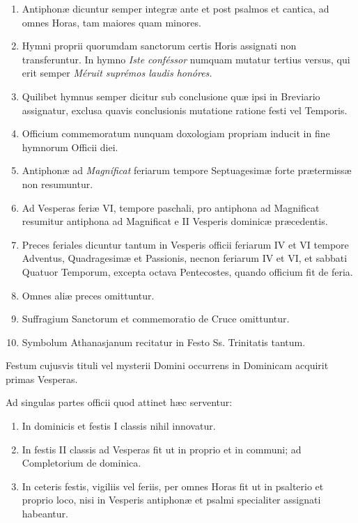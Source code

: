 \documentclass[vesperale_romanum.tex]{subfiles}
\begin{document}
\begin{enumerate}[nosep]
\item Antiphonæ dicuntur semper integræ ante et post psalmos et cantica, ad omnes Horas, tam maiores quam minores.
\item Hymni proprii quorumdam sanctorum certis Horis assignati non transferuntur. In hymno \textit{Iste conféssor} numquam mutatur tertius versus, qui erit semper \textit{Méruit suprémos laudis honóres.}
\item Quilibet hymnus semper dicitur sub conclusione quæ ipsi in Breviario assignatur, exclusa quavis conclusionis mutatione ratione festi vel Temporis.
\item Officium commemoratum nunquam doxologiam propriam inducit in fine hymnorum Officii diei.
\item Antiphonæ ad \textit{Magníficat} feriarum tempore Septuagesimæ forte prætermissæ non resumuntur.
\item Ad Vesperas feriæ VI, tempore paschali, pro antiphona ad Magnificat resumitur antiphona ad Magnificat e II Vesperis dominicæ præcedentis.
\item Preces feriales dicuntur tantum in Vesperis officii feriarum IV et VI tempore Adventus, Quadragesimæ et Passionis, necnon feriarum IV et VI, et sabbati Quatuor Temporum, excepta octava Pentecostes, quando officium fit de feria.
\item Omnes aliæ preces omittuntur.
 \item Suffragium Sanctorum et commemoratio de Cruce omittuntur.
\item Symbolum Athanasjanum recitatur in Festo Ss. Trinitatis tantum.
\end{enumerate}


Festum cujusvis tituli vel mysterii Domini occurrens in Dominicam acquirit primas Vesperas.

Ad singulas partes officii quod attinet hæc serventur:
\begin{enumerate}[nosep,label=\alph*.]
\item In dominicis et festis I classis nihil innovatur.
\item In festis II classis ad Vesperas fit ut in proprio et in communi; ad Completorium de dominica.
\item In ceteris festis, vigiliis vel feriis, per omnes Horas fit ut in psalterio et proprio loco, nisi in Vesperis antiphonæ et psalmi specialiter assignati habeantur.
\end{enumerate}
\end{document}
